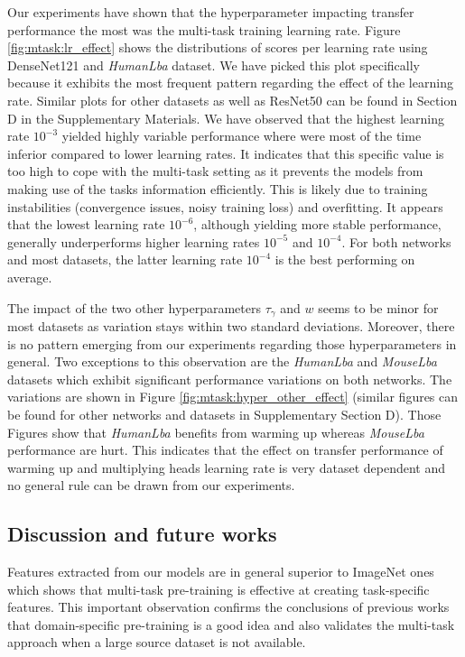 Our experiments have shown that the hyperparameter impacting transfer performance the most was the multi-task training learning rate. Figure \ref{fig:mtask:lr_effect} shows the distributions of scores per learning rate using DenseNet121 and \textit{HumanLba} dataset. We have picked this plot specifically because it exhibits the most frequent pattern regarding the effect of the learning rate. Similar plots for other datasets as well as ResNet50 can be found in Section D  in the Supplementary Materials. We have observed that the highest learning rate $10^{-3}$ yielded highly variable performance where were most of the time inferior compared to lower learning rates. It indicates that this specific value is too high to cope with the multi-task setting as it prevents the models from making use of the tasks information efficiently. This is likely due to training instabilities (convergence issues, noisy training loss) and overfitting. It appears that the lowest learning rate $10^{-6}$, although yielding more stable performance, generally underperforms higher learning rates $10^{-5}$ and $10^{-4}$. For both networks and most datasets, the latter learning rate $10^{-4}$ is the best performing on average.

The impact of the two other hyperparameters $\tau_\gamma$ and $w$ seems to be minor for most datasets as variation stays within two standard deviations. Moreover, there is no pattern emerging from our experiments regarding those hyperparameters in general. Two exceptions to this observation are the \textit{HumanLba} and \textit{MouseLba} datasets which exhibit significant performance variations on both networks. The variations are shown in Figure \ref{fig:mtask:hyper_other_effect} (similar figures can be found for other networks and datasets in Supplementary Section D). Those Figures show that \textit{HumanLba} benefits from warming up whereas \textit{MouseLba} performance are hurt. This indicates that the effect on transfer performance of warming up and multiplying heads learning rate is very dataset dependent and no general rule can be drawn from our experiments.

\subsection{Discussion and future works}
\label{ssec:mtask:res:discussion}


Features extracted from our models are in general superior to ImageNet ones %
which shows that multi-task pre-training is effective at creating task-specific features. This important observation confirms the conclusions of previous works that domain-specific pre-training is a good idea and also validates the multi-task approach when a large source dataset is not available. 

